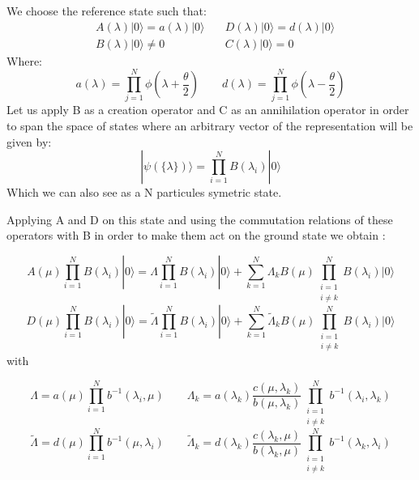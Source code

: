 \documentclass[12pt]{article}
\begin{document}

We choose the reference state such that:
\begin{align}
&A(\lambda)|0\rangle = a(\lambda) |0\rangle\quad &D(\lambda)|0\rangle=d(\lambda)|0\rangle\\
&B(\lambda)|0\rangle\neq 0 				\quad &C(\lambda)|0\rangle=0
\end{align}
Where:  
\begin{equation}
a(\lambda)=\prod_{j=1}^{N}\phi(\lambda+\frac{\theta}{2}) \qquad d(\lambda)=\prod_{j=1}^{N}\phi(\lambda-\frac{\theta}{2})
\end{equation}
Let us apply B as a creation operator and C as an annihilation operator in order to span the space of states where an arbitrary vector of the representation will be given by: 
\begin{equation}
|\psi(\{\lambda\})\rangle=\prod_{i=1}^{N}B(\lambda_{i})|0\rangle
\end{equation}
Which we can also see as a N particules symetric state.

Applying A and D on this state and using the commutation relations of these operators with B in order to make them act on the ground state we obtain :

\begin{equation}
A(\mu)\prod_{i=1}^{N}B(\lambda_{i})|0\rangle=\Lambda\prod_{i=1}^{N}B(\lambda_{i})|0\rangle+\sum_{k=1}^{N}\Lambda_{k} B(\mu) \prod_{\substack{i=1\\ i\neq k}}^{N}B(\lambda_{i})|0\rangle
\end{equation}
\begin{equation}
D(\mu)\prod_{i=1}^{N}B(\lambda_{i})|0\rangle=\widetilde{\Lambda}\prod_{i=1}^{N}B(\lambda_{i})|0\rangle+\sum_{k=1}^{N}\widetilde{\Lambda}_{k} B(\mu) \prod_{\substack{i=1\\ i\neq k}}^{N}B(\lambda_{i})|0\rangle
\end{equation}
with

\begin{equation}
\Lambda=a(\mu)\prod_{i=1}^{N}b^{-1}(\lambda_{i},\mu)\qquad \Lambda_{k}=a(\lambda_{k})\frac{c(\mu,\lambda_{k})}{b(\mu,\lambda_{k})}\prod_{\substack{i=1\\ i\neq k}}^{N}b^{-1}(\lambda_{i},\lambda_{k})
\end{equation}
\begin{equation}
\widetilde{\Lambda}=d(\mu)\prod_{i=1}^{N}b^{-1}(\mu,\lambda_{i})\qquad \widetilde{\Lambda}_{k}=d(\lambda_{k})\frac{c(\lambda_{k},\mu)}{b(\lambda_{k},\mu)}\prod_{\substack{i=1\\ i\neq k}}^{N}b^{-1}(\lambda_{k},\lambda_{i})
\end{equation}
\end{document}
